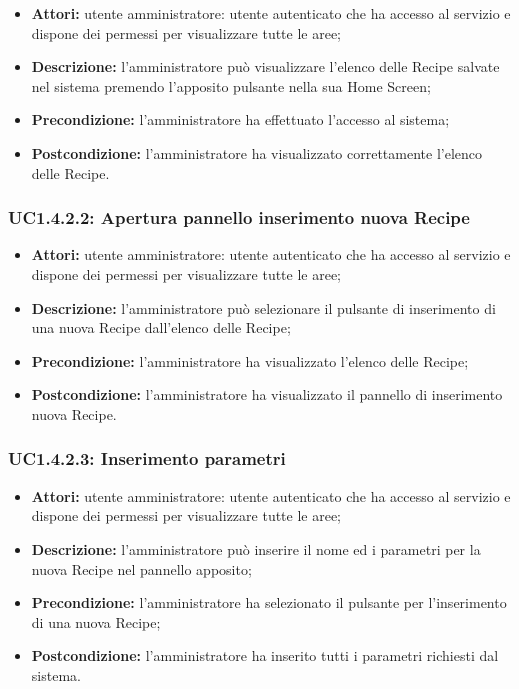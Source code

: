 \begin{itemize}
    \item \textbf{Attori:} utente amministratore: utente autenticato che ha accesso al servizio e dispone dei permessi per visualizzare tutte le aree;
    \item \textbf{Descrizione:} l'amministratore può visualizzare l'elenco delle Recipe salvate nel sistema premendo l'apposito pulsante nella sua Home Screen;
    \item \textbf{Precondizione:} l'amministratore ha effettuato l'accesso al sistema;
    \item \textbf{Postcondizione:} l'amministratore ha visualizzato correttamente l'elenco delle Recipe.
\end{itemize}

\subsubsection{UC1.4.2.2: Apertura pannello inserimento nuova Recipe}

\begin{itemize}
   	\item \textbf{Attori:} utente amministratore: utente autenticato che ha accesso al servizio e dispone dei permessi per visualizzare tutte le aree;
    \item \textbf{Descrizione:} l'amministratore può selezionare il pulsante di inserimento di una nuova Recipe dall'elenco delle Recipe;
    \item \textbf{Precondizione:} l'amministratore ha visualizzato l'elenco delle Recipe;
    \item \textbf{Postcondizione:} l'amministratore ha visualizzato il pannello di inserimento nuova Recipe.
\end{itemize}

\subsubsection{UC1.4.2.3: Inserimento parametri}

\begin{itemize}
   	\item \textbf{Attori:} utente amministratore: utente autenticato che ha accesso al servizio e dispone dei permessi per visualizzare tutte le aree;
    \item \textbf{Descrizione:} l'amministratore può inserire il nome ed i parametri per la nuova Recipe nel pannello apposito;
    \item \textbf{Precondizione:} l'amministratore ha selezionato il pulsante per l'inserimento di una nuova Recipe;
    \item \textbf{Postcondizione:} l'amministratore ha inserito tutti i parametri richiesti dal sistema.
\end{itemize}

